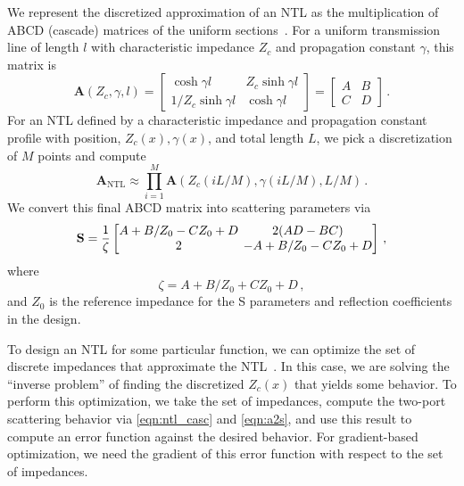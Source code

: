 We represent the discretized approximation of an NTL as the multiplication of ABCD (cascade) matrices of the uniform sections~\cite{maoAnalysisTimeResponse1992}.
For a uniform transmission line of length $l$ with characteristic impedance $Z_c$ and propagation constant $\gamma$, this matrix is
%
\begin{equation}
	\mathbf{A}\left(Z_c,\gamma,l\right) = \begin{bmatrix}
		\cosh{\gamma l}                & Z_{c}\sinh{\gamma l} \\
		1/Z_c\sinh{\gamma l} & \cosh{\gamma l}
	\end{bmatrix} = \begin{bmatrix}
		A & B \\
		C & D
	\end{bmatrix} \,.
	\label{eqn:tl_abcd}
\end{equation}
%
For an NTL defined by a characteristic impedance and propagation constant profile with position, $Z_c(x), \gamma(x)$, and total length $L$, we pick a discretization of $M$ points and compute
%
\begin{equation}
	\mathbf{A}_{\text{NTL}} \approx \prod_{i=1}^{M} \mathbf{A}\left(Z_c\left( iL/M \right),\gamma\left(iL/M \right),L/M \right) \,.
	\label{eqn:ntl_casc}
\end{equation}
%
We convert this final ABCD matrix into scattering parameters via
\begin{equation}
	\mathbf{S} = \frac{1}{\zeta}
    \begingroup %
    \setlength\arraycolsep{2pt}
	\begin{bmatrix}
		A + B/Z_0 - CZ_0 + D & 2(AD-BC)          \\
		2                            & -A + B/Z_0 - CZ_0 + D
	\end{bmatrix}
    \endgroup \,,
	\label{eqn:a2s}
\end{equation}
where
\begin{equation}
	\zeta = A + B/Z_0 + CZ_0 + D \,,
\end{equation}
and $Z_0$ is the reference impedance for the S parameters and reflection coefficients in the design.

To design an NTL for some particular function, we can optimize the set of discrete impedances that approximate the NTL~\cite{miazgaNonuniformTransmissionLine2014}.
In this case, we are solving the “inverse problem” of finding the discretized $Z_c(x)$ that yields some behavior.
To perform this optimization, we take the set of impedances, compute the two-port scattering behavior via \eqref{eqn:ntl_casc} and \eqref{eqn:a2s}, and use this result to compute an error function against the desired behavior.
For gradient-based optimization, we need the gradient of this error function with respect to the set of impedances.

